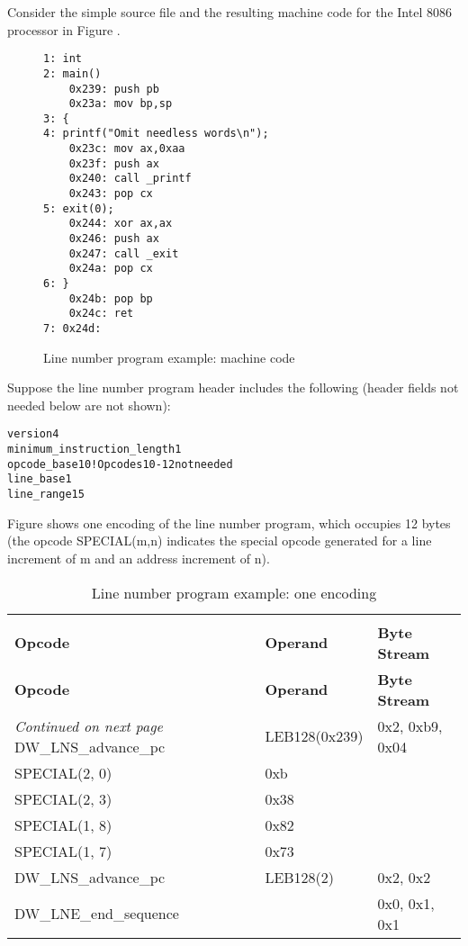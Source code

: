 Consider the simple source file and the resulting machine
code for the Intel 8086 processor in 
Figure .

\begin{figure}[here]
\begin{lstlisting}
1: int
2: main()
    0x239: push pb
    0x23a: mov bp,sp
3: {
4: printf("Omit needless words\n");
    0x23c: mov ax,0xaa
    0x23f: push ax
    0x240: call _printf
    0x243: pop cx
5: exit(0);
    0x244: xor ax,ax
    0x246: push ax
    0x247: call _exit
    0x24a: pop cx
6: }
    0x24b: pop bp
    0x24c: ret
7: 0x24d:
\end{lstlisting}
\caption{Line number program example: machine code} \label{fig:linenumberprogramexamplemachinecode}
\end{figure}

Suppose the line number program header includes the following
(header fields not needed below are not shown):



\begin{alltt}
version                    4
minimum_instruction_length 1
opcode_base               10 ! Opcodes 10-12 not needed
line_base                  1
line_range                15
\end{alltt}


Figure 
shows one encoding of the line number program, which occupies
12 bytes (the opcode SPECIAL(m,n) indicates the special opcode
generated for a line increment of m and an address increment
of n).


\begin{centering}
\setlength{\extrarowheight}{0.1cm}
\begin{longtable}{lll}
  \caption{Line number program example: one encoding} \label{tab:linenumberprogramexampleoneencoding} \\
  \hline \\ \bfseries Opcode &\bfseries Operand &\bfseries Byte Stream \\ \hline
\endfirsthead
  \bfseries Opcode &\bfseries Operand &\bfseries Byte Stream\\ \hline
\endhead
  \hline \emph{Continued on next page}
\endfoot
  \hline
\endlastfoot
DW\_LNS\_advance\_pc&LEB128(0x239)&0x2, 0xb9, 0x04 \\
SPECIAL(2, 0)&0xb  & \\
SPECIAL(2, 3)&0x38 & \\
SPECIAL(1, 8)&0x82 & \\
SPECIAL(1, 7)&0x73 & \\
DW\_LNS\_advance\_pc&LEB128(2)&0x2, 0x2 \\
DW\_LNE\_end\_sequence &&0x0, 0x1, 0x1 \\
\end{longtable}
\end{centering}


